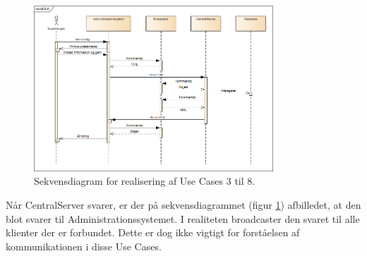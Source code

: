 \begin{figure}[H]
    \centering
    \includegraphics[width=0.8\textwidth]{Systemarkitektur/LogiskView/Realiseringer/Images/UC38.png}
    \caption{Sekvensdiagram for realisering af Use Cases 3 til 8.}
    \label{fig:uc38sq}
\end{figure}

Når CentralServer svarer, er der på sekvensdiagrammet (figur \ref{fig:uc38sq}) afbilledet, at den blot svarer til Administrationssystemet. I realiteten broadcaster den svaret til alle klienter der er forbundet. Dette er dog ikke vigtigt for forståelsen af kommunikationen i disse Use Cases.